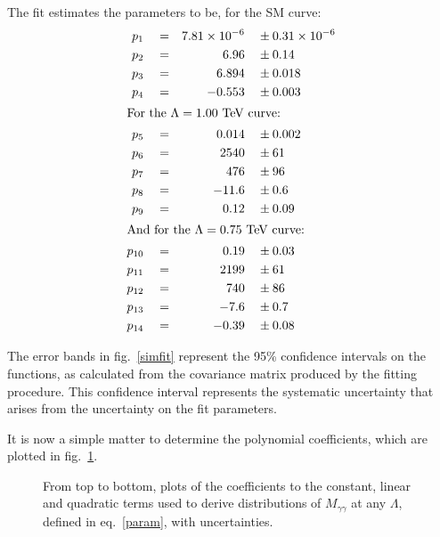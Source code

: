 The fit estimates the parameters to be, for the SM curve:\allowdisplaybreaks
\begin{align*}
p_1                      & \quad = &  7.81\times10^{-6}   \quad & \pm    0.31\times10^{-6} \\
p_2                      & \quad = &      6.96   \quad & \pm    0.14    \\
p_3                      & \quad = &      6.894   \quad & \pm    0.018    \\
p_4                      & \quad = &    -0.553   \quad & \pm    0.003  \\
\intertext{For the $\Lambda = 1.00$ TeV curve:}
p_5                      & \quad = &     0.014   \quad & \pm    0.002  \\
p_6                      & \quad = &      2540   \quad & \pm    61     \\
p_7                      & \quad = &      476   \quad & \pm    96     \\
p_8                      & \quad = &     -11.6   \quad & \pm    0.6   \\
p_9                      & \quad = &     0.12   \quad & \pm    0.09   \\
\intertext{And for the $\Lambda=0.75$ TeV curve:}
p_{10}                     & \quad = &     0.19   \quad & \pm    0.03   \\
p_{11}                     & \quad = &      2199   \quad & \pm    61     \\
p_{12}                     & \quad = &      740   \quad & \pm    86     \\
p_{13}                     & \quad = &     -7.6   \quad & \pm    0.7    \\
p_{14}                     & \quad = &    -0.39   \quad & \pm    0.08   
\end{align*}

The error bands in fig.~\ref{simfit} represent the 95\% confidence intervals on the functions, as calculated from the covariance matrix produced by the fitting procedure. This confidence interval represents the systematic uncertainty that arises from the uncertainty on the fit parameters.

It is now a simple matter to determine the polynomial coefficients, which are plotted in fig.~\ref{coef}.

\begin{figure}[hbt]
\begin{minipage}[b]{.69\textwidth}
\begin{infilsf}\tiny

\end{infilsf}
\end{minipage}\hfill
\begin{minipage}[b]{.3\textwidth}
\caption{From top to bottom, plots of the coefficients to the constant, linear and quadratic terms used to derive distributions of $M_{\gamma\gamma}$ at any $\Lambda$, defined in eq.~\eqref{param}, with uncertainties.}\label{coef}
\end{minipage}
\end{figure}


